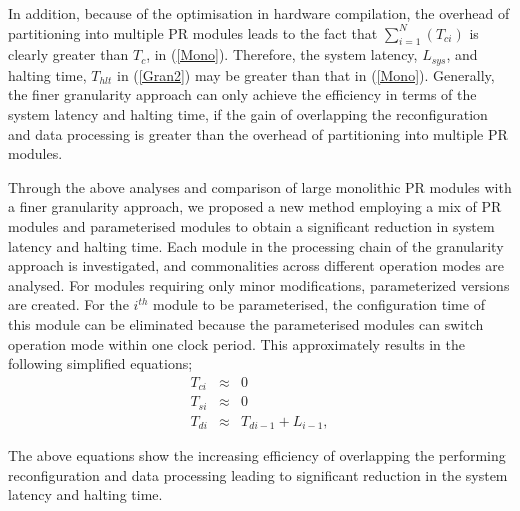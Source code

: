 In addition, because of the optimisation in hardware compilation, the overhead of partitioning into multiple PR modules leads to the fact that $\sum_{i = 1}^{N}(T_{ci})$ is clearly greater than $T_{c}$, in (\ref{Mono}). Therefore, the system latency, $L_{sys}$, and halting time, $T_{hlt}$ in (\ref{Gran2}) may be greater than that in (\ref{Mono}).
Generally, the finer granularity approach can only achieve the efficiency in terms of the system latency and halting time, if the gain of overlapping the reconfiguration and data processing is greater than the overhead of partitioning into multiple PR modules.

Through the above analyses and comparison of large monolithic PR modules with a finer granularity approach, we proposed a new method employing a mix of PR modules and parameterised modules to obtain a significant reduction in system latency and halting time. Each module in the processing chain of the granularity approach is investigated, and commonalities across different operation modes are analysed. For modules requiring only minor modifications, parameterized versions are created.
For the $i^{th}$ module to be parameterised, the configuration time of this module can be eliminated because the parameterised modules can switch operation mode within one clock period. This approximately results in the following simplified equations;
\begin{eqnarray}
\label{Pro}
T_{ci} &\approx & 0   \nonumber \\
T_{si} &\approx & 0 \nonumber \\
T_{di} &\approx & T_{di-1} +  L_{i-1},
\end{eqnarray}

The above equations show the increasing efficiency of overlapping the performing reconfiguration and data processing leading to significant reduction in the system latency and halting time.

